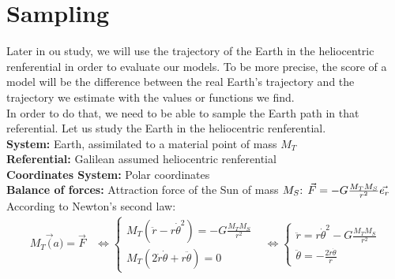 \section{Sampling}
Later in ou study, we will use the trajectory of the Earth in the heliocentric
renferential in order to evaluate our models. To be more precise, the score of
a model will be the difference between the real Earth's trajectory and the
trajectory we estimate with the values or functions we find.\\
In order to do that, we need to be able to sample the Earth path in that
referential. Let us study the Earth in the heliocentric renferential.\\

\noindent
\textbf{System:} Earth, assimilated to a material point of mass \(M_{T}\)\\
\textbf{Referential:} Galilean assumed heliocentric renferential\\
\textbf{Coordinates System:} Polar coordinates\\
\textbf{Balance of forces:} Attraction force of the Sun of mass \(M_{S}$:
$\vec{F} = -G\frac{M_{T} M_{S}}{r^{2}}\vec{e_{r}}\)\\

According to Newton's second law:
\[
    \begin{align*}
        M_{T}\vec(a) = \vec{F}
         & \iff
        \begin{equation}
            \begin{cases}
                M_{T}(\ddot{r}-r\dot{\theta}^{2}) = -G\frac{M_{T} M_{S}}{r^{2}}
                \\
                M_{T}(2\dot{r}\dot{\theta}+r\ddot{\theta}) = 0
            \end{cases}
        \end{equation}
         & \iff
        \begin{equation}
            \begin{cases}
                \ddot{r} = r\dot{\theta}^{2}-G\frac{M_{T} M_{S}}{r^{2}} \\
                \ddot{\theta} = -\frac{2\dot{r}\dot{\theta}}{r}
            \end{cases}
        \end{equation}
    \end{align*}
\]

